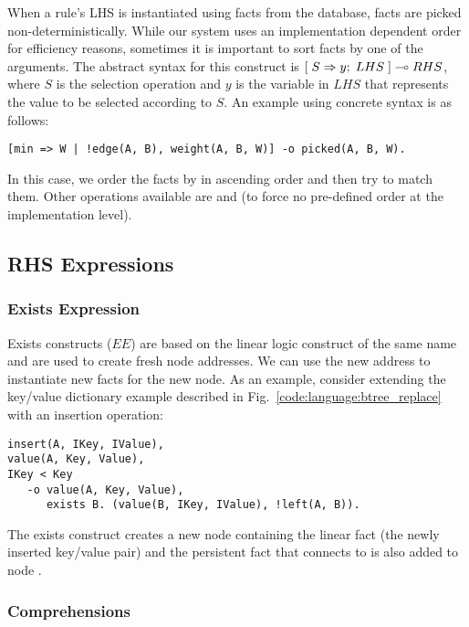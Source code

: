 When a rule's LHS is instantiated using facts from the database, facts are
picked non-deterministically. While our system uses an implementation dependent
order for efficiency reasons, sometimes it is important to sort facts by one of
the arguments. The abstract syntax for this construct is
$[\; S \Rightarrow y; \; LHS \;] \multimap RHS$, where $S$ is the selection operation and $y$ is the
variable in $LHS$ that represents the value to be selected according to $S$. An
example using concrete syntax is as follows:

\begin{Verbatim}[fontsize=\codesize]
[min => W | !edge(A, B), weight(A, B, W)] -o picked(A, B, W).
\end{Verbatim}

In this case, we order the  facts by  in ascending order
and then try to match them. Other operations available are  and
 (to force no pre-defined order at the implementation level).

\subsection{RHS Expressions}\label{section:language:expressions}

\subsubsection{Exists Expression}

Exists constructs ($EE$) are based on the linear logic construct of the same
name and are used to create fresh node addresses. We can use the new address to
instantiate new facts for the new node. As an example, consider extending the
key/value dictionary example described in Fig.~\ref{code:language:btree_replace}
with an insertion operation:

\begin{Verbatim}[fontsize=\codesize]
insert(A, IKey, IValue),
value(A, Key, Value),
IKey < Key
   -o value(A, Key, Value),
      exists B. (value(B, IKey, IValue), !left(A, B)).
\end{Verbatim}

The exists construct creates a new node  containing the linear fact
 (the newly inserted key/value pair) and the
persistent fact  that connects  to  is also
added to node .

\subsubsection{Comprehensions}

